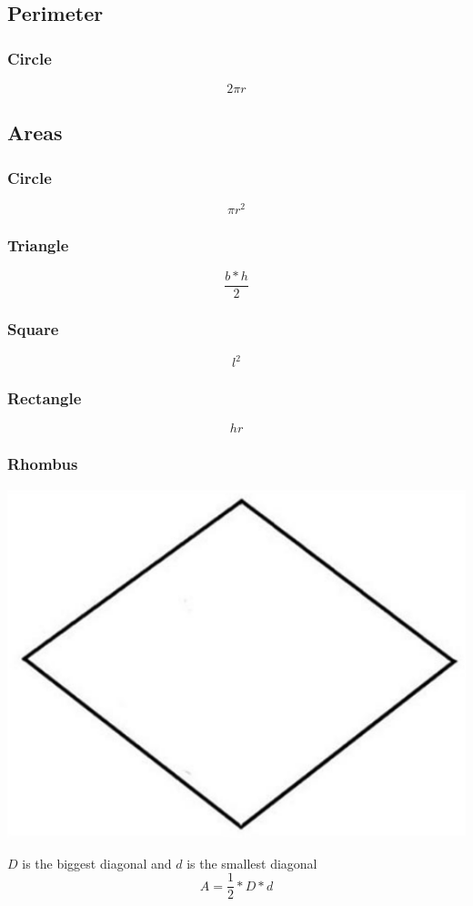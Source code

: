 \subsection{Perimeter}
\subsubsection{Circle}
$$ 2 \pi r $$

\subsection{Areas}
\subsubsection{Circle}
$$ \pi r^2 $$
\subsubsection{Triangle}
$$ \dfrac{b * h}{2} $$
\subsubsection{Square}
$$ l^2 $$
\subsubsection{Rectangle}
$$ hr $$
\subsubsection{Rhombus}
\begin{center}
    \includegraphics[scale=.2, keepaspectratio]{./Theory/images/rhombus.png}
\end{center}
$D$ is the biggest diagonal and $d$ is the smallest diagonal
$$ A = \dfrac{1}{2} * D * d $$

